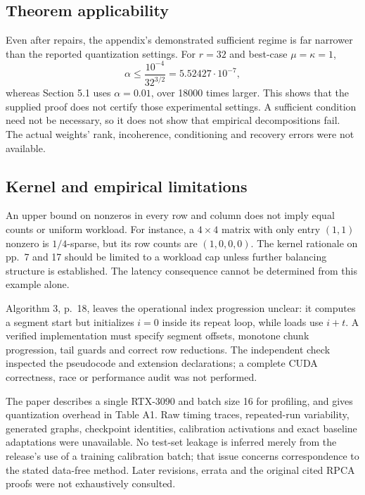 \documentclass[10pt]{article}
\begin{document}
\subsection*{Theorem applicability}
Even after repairs, the appendix’s demonstrated sufficient regime is far narrower than the reported quantization settings. For \(r=32\) and best-case \(\mu=\kappa=1\), \[\alpha\le\frac{10^{-4}}{32^{3/2}}
=5.52427\cdot10^{-7},\] whereas Section 5.1 uses \(\alpha=0.01\), over 18000 times larger. This shows that the supplied proof does not certify those experimental settings. A sufficient condition need not be necessary, so it does not show that empirical decompositions fail. The actual weights’ rank, incoherence, conditioning and recovery errors were not available.\par
\subsection*{Kernel and empirical limitations}
An upper bound on nonzeros in every row and column does not imply equal counts or uniform workload. For instance, a \(4\times4\) matrix with only entry \((1,1)\) nonzero is \(1/4\)-sparse, but its row counts are \((1,0,0,0)\). The kernel rationale on pp. 7 and 17 should be limited to a workload cap unless further balancing structure is established. The latency consequence cannot be determined from this example alone.\par
Algorithm 3, p. 18, leaves the operational index progression unclear: it computes a segment start but initializes \(i=0\) inside its repeat loop, while loads use \(i+t\). A verified implementation must specify segment offsets, monotone chunk progression, tail guards and correct row reductions. The independent check inspected the pseudocode and extension declarations; a complete CUDA correctness, race or performance audit was not performed.\par
The paper describes a single RTX-3090 and batch size 16 for profiling, and gives quantization overhead in Table A1. Raw timing traces, repeated-run variability, generated graphs, checkpoint identities, calibration activations and exact baseline adaptations were unavailable. No test-set leakage is inferred merely from the release’s use of a training calibration batch; that issue concerns correspondence to the stated data-free method. Later revisions, errata and the original cited RPCA proofs were not exhaustively consulted.\par
\end{document}
